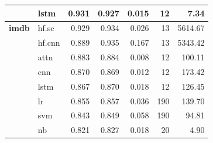 \documentclass[final]{clv2025}
\begin{document}
\begin{table}[h!]
{\begin{tabular}{@{}p{2cm}p{1.2cm}rrrrr@{}}
 & lstm & 0.931 & 0.927 & 0.015 & 12 & 7.34 \\
\midrule
\textbf{imdb} & hf.sc & 0.929 & 0.934 & 0.026 & 13 & 5614.67 \\
 & hf.cnn & 0.889 & 0.935 & 0.167 & 13 & 5343.42 \\
 & attn & 0.883 & 0.884 & 0.008 & 12 & 100.11 \\
 & cnn & 0.870 & 0.869 & 0.012 & 12 & 173.42 \\
 & lstm & 0.867 & 0.870 & 0.018 & 12 & 126.45 \\
 & lr & 0.855 & 0.857 & 0.036 & 190 & 139.70 \\
 & svm & 0.843 & 0.849 & 0.058 & 190 & 94.81 \\
 & nb & 0.821 & 0.827 & 0.018 & 20 & 4.90 \\
\bottomrule
\end{tabular}%
}
\end{table}
\end{document}
